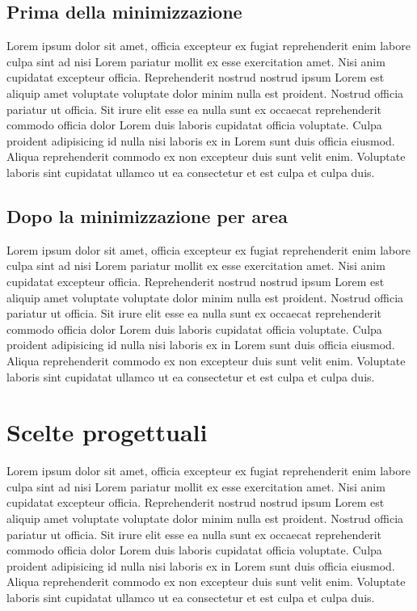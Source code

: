 \documentclass[a4paper]{article}
\begin{document}
\subsection{Prima della minimizzazione}
Lorem ipsum dolor sit amet, officia excepteur ex fugiat reprehenderit enim labore culpa sint ad nisi Lorem pariatur mollit ex esse exercitation amet. Nisi anim cupidatat excepteur officia. Reprehenderit nostrud nostrud ipsum Lorem est aliquip amet voluptate voluptate dolor minim nulla est proident. Nostrud officia pariatur ut officia. Sit irure elit esse ea nulla sunt ex occaecat reprehenderit commodo officia dolor Lorem duis laboris cupidatat officia voluptate. Culpa proident adipisicing id nulla nisi laboris ex in Lorem sunt duis officia eiusmod. Aliqua reprehenderit commodo ex non excepteur duis sunt velit enim. Voluptate laboris sint cupidatat ullamco ut ea consectetur et est culpa et culpa duis.

\subsection{Dopo la minimizzazione per area}
Lorem ipsum dolor sit amet, officia excepteur ex fugiat reprehenderit enim labore culpa sint ad nisi Lorem pariatur mollit ex esse exercitation amet. Nisi anim cupidatat excepteur officia. Reprehenderit nostrud nostrud ipsum Lorem est aliquip amet voluptate voluptate dolor minim nulla est proident. Nostrud officia pariatur ut officia. Sit irure elit esse ea nulla sunt ex occaecat reprehenderit commodo officia dolor Lorem duis laboris cupidatat officia voluptate. Culpa proident adipisicing id nulla nisi laboris ex in Lorem sunt duis officia eiusmod. Aliqua reprehenderit commodo ex non excepteur duis sunt velit enim. Voluptate laboris sint cupidatat ullamco ut ea consectetur et est culpa et culpa duis.



\section{Scelte progettuali}
Lorem ipsum dolor sit amet, officia excepteur ex fugiat reprehenderit enim labore culpa sint ad nisi Lorem pariatur mollit ex esse exercitation amet. Nisi anim cupidatat excepteur officia. Reprehenderit nostrud nostrud ipsum Lorem est aliquip amet voluptate voluptate dolor minim nulla est proident. Nostrud officia pariatur ut officia. Sit irure elit esse ea nulla sunt ex occaecat reprehenderit commodo officia dolor Lorem duis laboris cupidatat officia voluptate. Culpa proident adipisicing id nulla nisi laboris ex in Lorem sunt duis officia eiusmod. Aliqua reprehenderit commodo ex non excepteur duis sunt velit enim. Voluptate laboris sint cupidatat ullamco ut ea consectetur et est culpa et culpa duis.
\end{document}
